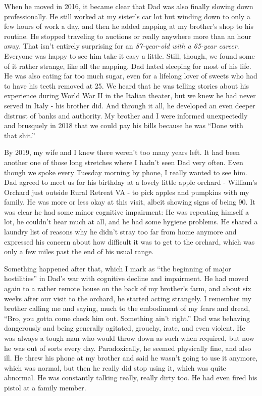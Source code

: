 \documentclass{article}
\begin{document}
When he moved in 2016, it became clear that Dad was also finally slowing down professionally. He still worked at my sister's car lot but winding down to only a few hours of work a day, and then he added napping at my brother's shop to his routine. He stopped traveling to auctions or really anywhere more than an hour away. That isn't entirely surprising for an \textit{87-year-old with a 65-year career}. Everyone was happy to see him take it easy a little. Still, though, we found some of it rather strange, like all the napping. Dad hated sleeping for most of his life. He was also eating far too much sugar, even for a lifelong lover of sweets who had to have his teeth removed at 25. We heard that he was telling stories about his experience during World War II in the Italian theater, but we knew he had never served in Italy - his brother did. And through it all, he developed an even deeper distrust of banks and authority. My brother and I were informed unexpectedly and brusquely in 2018 that we could pay his bills because he was ``Done with that shit.''

By 2019, my wife and I knew there weren't too many years left. It had been another one of those long stretches where I hadn't seen Dad very often. Even though we spoke every Tuesday morning by phone, I really wanted to see him. Dad agreed to meet us for his birthday at a lovely little apple orchard - William's Orchard just outside Rural Retreat VA - to pick apples and pumpkins with my family. He was more or less okay at this visit, albeit showing signs of being 90. It was clear he had some minor cognitive impairment: He was repeating himself a lot, he couldn't hear much at all, and he had some hygiene problems. He shared a laundry list of reasons why he didn't stray too far from home anymore and expressed his concern about how difficult it was to get to the orchard, which was only a few miles past the end of his usual range.

Something happened after that, which I mark as ``the beginning of major hostilities'' in Dad's war with cognitive decline and impairment. He had moved again to a rather remote house on the back of my brother's farm, and about six weeks after our visit to the orchard, he started acting strangely. I remember my brother calling me and saying, much to the embodiment of my fears and dread, ``Bro, you gotta come check him out. Something ain't right.'' Dad was behaving dangerously and being generally agitated, grouchy, irate, and even violent. He was always a tough man who would throw down as such when required, but now he was out of sorts every day. Paradoxically, he seemed physically fine, and also ill. He threw his phone at my brother and said he wasn't going to use it anymore, which was normal, but then he really did stop using it, which was quite abnormal. He was constantly talking really, really dirty too. He had even fired his pistol at a family member.
\end{document}
